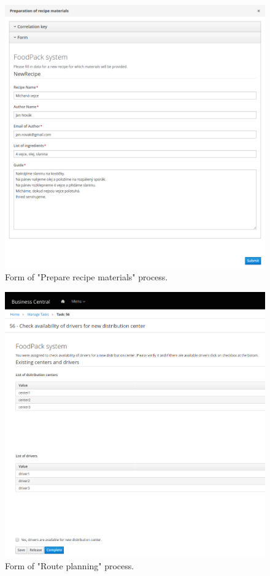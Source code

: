 \documentclass[11pt,a4paper]{article}
\begin{document}
\begin{figure}[H]
    \centering
    \includegraphics[width=\textwidth]{testing2.png}
    \caption{Form of "Prepare recipe materials" process.}
\end{figure}

\begin{figure}[H]
    \centering
    \includegraphics[width=\textwidth]{testing3.png}
    \caption{Form of "Route planning" process.}
\end{figure}
\end{document}
